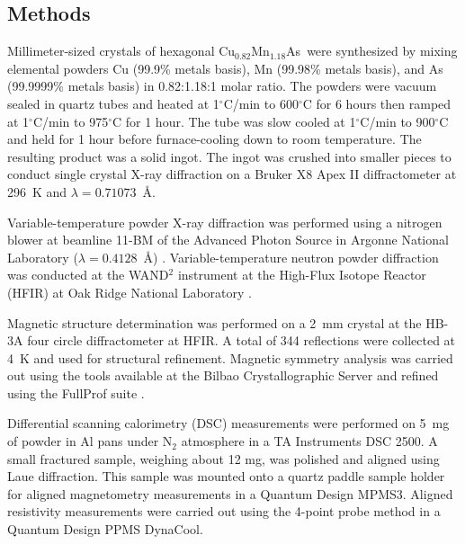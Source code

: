 \documentclass[letterpaper,10pt,doublespacing,edeposit]{uiucthesis2020}
\newcommand*{\cumnas}{Cu$_{0.82}$Mn$_{1.18}$As}
\begin{document}
\begin{mainmatter}
\section{Methods}

Millimeter-sized crystals of hexagonal \cumnas\ were synthesized by mixing elemental powders Cu (99.9\% metals basis), Mn (99.98\% metals basis), and As (99.9999\% metals basis) in 0.82:1.18:1 molar ratio. 
The powders were vacuum sealed in quartz tubes and heated at 1$^\circ$C/min to 600$^{\circ}$C for 6 hours then ramped at 1$^{\circ}$C/min to 975$^{\circ}$C for 1 hour. The tube was slow cooled at 1$^{\circ}$C/min to 900$^{\circ}$C and held for 1 hour before furnace-cooling down to room temperature. The resulting product was a solid ingot. The ingot was crushed into smaller pieces to conduct single crystal X-ray diffraction on a Bruker X8 Apex II diffractometer at 296~K and $\lambda = 0.71073$~\AA. 


Variable-temperature powder X-ray diffraction was performed using a nitrogen blower at beamline 11-BM of the Advanced Photon Source in Argonne National Laboratory ($\lambda = 0.4128$~\AA) \cite{wang_dedicated_2008}. Variable-temperature neutron powder diffraction was conducted at the WAND$^2$ instrument at the High-Flux Isotope Reactor (HFIR) at Oak Ridge National Laboratory \cite{Frontzek_new}.


Magnetic structure determination was performed on a 2~mm crystal at the HB-3A four circle diffractometer at HFIR. A total of 344 reflections were collected at 4~K and used for structural refinement. Magnetic symmetry analysis was carried out using the tools available at the Bilbao Crystallographic Server \cite{Perez-Mato2015}
and refined using the FullProf suite \cite{rodriguez-carvajal_recent_1993}.

Differential scanning calorimetry (DSC) measurements were performed on 5~mg of powder in Al pans under N$_2$ atmosphere in a TA Instruments DSC 2500. A small fractured sample, weighing about 12 mg, was polished and aligned using Laue diffraction. This sample was mounted onto a quartz paddle sample holder for aligned magnetometry measurements in a Quantum Design MPMS3. Aligned resistivity measurements were carried out using the 4-point probe method in a Quantum Design PPMS DynaCool.


\end{mainmatter}
\end{document}
